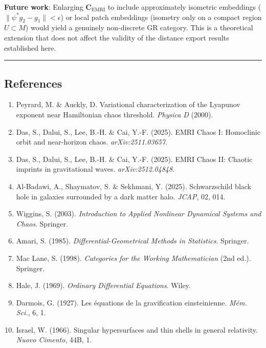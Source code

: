 \documentclass[
]{article}
\providecommand{\tightlist}{%
  \setlength{\itemsep}{0pt}\setlength{\parskip}{0pt}}
\begin{document}
\textbf{Future work}: Enlarging \(\mathbf{C}_{\text{EMRI}}\) to include
approximately isometric embeddings (\(\|\psi^* g_2 - g_1\| < \epsilon\))
or local patch embeddings (isometry only on a compact region
\(U \subset M\)) would yield a genuinely non-discrete GR category. This
is a theoretical extension that does not affect the validity of the
distance export results established here.

\begin{center}\rule{0.5\linewidth}{0.5pt}\end{center}

\subsection{References}\label{references}

\begin{enumerate}
\def\labelenumi{\arabic{enumi}.}
\tightlist
\item
  Peyrard, M. \& Auckly, D. Variational characterization of the Lyapunov
  exponent near Hamiltonian chaos threshold. \emph{Physica D} (2000).
\item
  Das, S., Dalui, S., Lee, B.-H. \& Cai, Y.-F. (2025). EMRI Chaos I:
  Homoclinic orbit and near-horizon chaos. \emph{arXiv:2511.03657}.
\item
  Das, S., Dalui, S., Lee, B.-H. \& Cai, Y.-F. (2025). EMRI Chaos II:
  Chaotic imprints in gravitational waves. \emph{arXiv:2512.04848}.
\item
  Al-Badawi, A., Shaymatov, S. \& Sekhmani, Y. (2025). Schwarzschild
  black hole in galaxies surrounded by a dark matter halo. \emph{JCAP},
  02, 014.
\item
  Wiggins, S. (2003). \emph{Introduction to Applied Nonlinear Dynamical
  Systems and Chaos}. Springer.
\item
  Amari, S. (1985). \emph{Differential-Geometrical Methods in
  Statistics}. Springer.
\item
  Mac Lane, S. (1998). \emph{Categories for the Working Mathematician}
  (2nd ed.). Springer.
\item
  Hale, J. (1969). \emph{Ordinary Differential Equations}. Wiley.
\item
  Darmois, G. (1927). Les équations de la gravification einsteinienne.
  \emph{Mém. Sci.}, 6, 1.
\item
  Israel, W. (1966). Singular hypersurfaces and thin shells in general
  relativity. \emph{Nuovo Cimento}, 44B, 1.
\end{enumerate}
\end{document}
